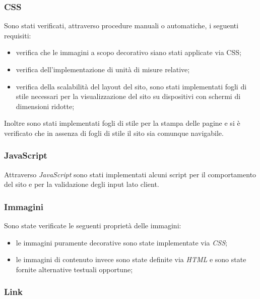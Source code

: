 \subsubsection{CSS}
\label{subsubsec:accessibility-css}

Sono stati verificati, attraverso procedure manuali o automatiche, i seguenti requisiti:
\begin{itemize}
    \item verifica che le immagini a scopo decorativo siano stati applicate via CSS;
    \item verifica dell'implementazione di unità di misure relative;
    \item verifica della scalabilità del layout del sito, sono stati implementati fogli di stile necessari per la visualizzazione del sito su dispositivi con schermi di dimensioni ridotte;
\end{itemize}

Inoltre sono stati implementati fogli di stile per la stampa delle pagine e si è verificato che in assenza di fogli di stile il sito sia comunque navigabile.

\subsubsection{JavaScript}
\label{subsubsec:accessibility-js}

Attraverso \textit{JavaScript} sono stati implementati alcuni script per il comportamento del sito e per la validazione degli input lato client.

\subsubsection{Immagini}
\label{subsubsec:accessibility-images}

Sono state verificate le seguenti proprietà delle immagini:
\begin{itemize}
    \item le immagini puramente decorative sono state implementate via \textit{CSS};
    \item le immagini di contenuto invece sono state definite via \textit{HTML} e sono state fornite alternative testuali opportune;
\end{itemize}

\subsubsection{Link}
\label{subsubsec:accessibility-links}

